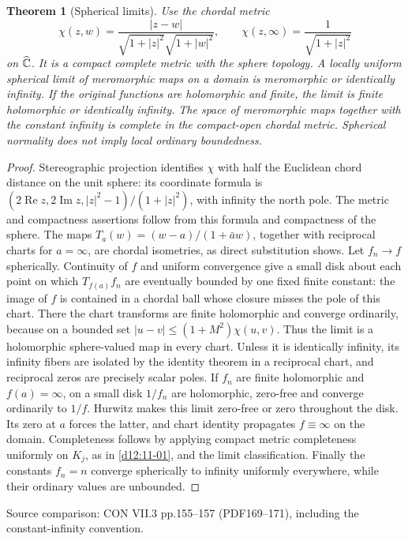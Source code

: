 \documentclass[11pt,a4paper,openany]{book}
\newtheorem{theorem}{Theorem}[chapter]
\theoremstyle{definition}
\theoremstyle{remark}\newtheorem{remark}[theorem]{Remark}
\DeclareMathOperator{\Ree}{Re}\DeclareMathOperator{\Imm}{Im}
\newcommand{\family}[1]{}
\newcommand{\source}[1]{\par\begingroup\small\sffamily\color{black!65}Source comparison: #1\par\endgroup}
\begin{document}
\begin{theorem}[Spherical limits]\family{D12.11.06}\label{d12:11-06}
Use the chordal metric
\[
 \chi(z,w)=\frac{|z-w|}{\sqrt{1+|z|^2}\sqrt{1+|w|^2}},\qquad
 \chi(z,\infty)=\frac1{\sqrt{1+|z|^2}}
\]
on $\widehat{\mathbb C}$. It is a compact complete metric with the sphere topology. A locally uniform spherical limit of meromorphic maps on a domain is meromorphic or identically infinity. If the original functions are holomorphic and finite, the limit is finite holomorphic or identically infinity. The space of meromorphic maps together with the constant infinity is complete in the compact-open chordal metric. Spherical normality does not imply local ordinary boundedness.
\end{theorem}
\begin{proof}
Stereographic projection identifies $\chi$ with half the Euclidean chord distance on the unit sphere: its coordinate formula is
$(2\Ree z,2\Imm z,|z|^2-1)/(1+|z|^2)$, with infinity the north pole. The metric and compactness assertions follow from this formula and compactness of the sphere. The maps
$T_a(w)=(w-a)/(1+\bar a w)$, together with reciprocal charts for $a=\infty$, are chordal isometries, as direct substitution shows.
Let $f_n\to f$ spherically. Continuity of $f$ and uniform convergence give a small disk about each point on which $T_{f(a)}f_n$ are eventually bounded by one fixed finite constant: the image of $f$ is contained in a chordal ball whose closure misses the pole of this chart. There the chart transforms are finite holomorphic and converge ordinarily, because on a bounded set $|u-v|\le(1+M^2)\chi(u,v)$. Thus the limit is a holomorphic sphere-valued map in every chart. Unless it is identically infinity, its infinity fibers are isolated by the identity theorem in a reciprocal chart, and reciprocal zeros are precisely scalar poles. If $f_n$ are finite holomorphic and $f(a)=\infty$, on a small disk $1/f_n$ are holomorphic, zero-free and converge ordinarily to $1/f$. Hurwitz makes this limit zero-free or zero throughout the disk. Its zero at $a$ forces the latter, and chart identity propagates $f\equiv\infty$ on the domain. Completeness follows by applying compact metric completeness uniformly on $K_j$, as in \cref{d12:11-01}, and the limit classification. Finally the constants $f_n=n$ converge spherically to infinity uniformly everywhere, while their ordinary values are unbounded.
\end{proof}
\source{CON VII.3 pp.155--157 (PDF169--171), including the constant-infinity convention.}
\end{document}

